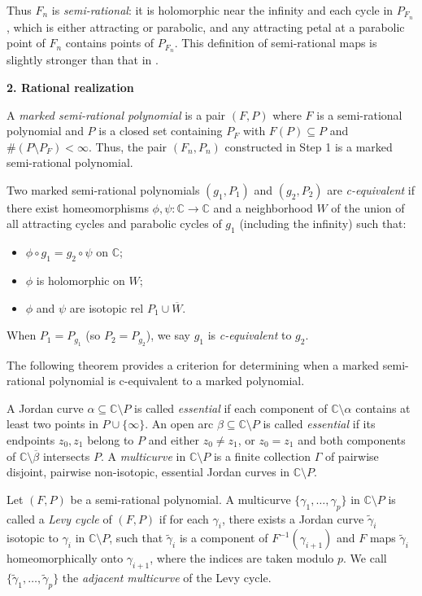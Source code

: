 \documentclass[a4paper,reqno,times, 11pt]{amsart}
\theoremstyle{remark}
\theoremstyle{plain}
\numberwithin{equation}{section}
\newcommand{\wt}{\widetilde}
\def\g{\gamma}
\def\G{\Gamma}
\def\C{\mbox{$\mathbb C$}}
\begin{document}
		Thus $F_n$ is  \emph{semi-rational}: it is holomorphic near the infinity and  each cycle in $P_{F_n}$, which is either attracting or parabolic, and any attracting petal at a parabolic point of $F_n$ contains points of $P_{F_n}$. This definition of  semi-rational maps is slightly stronger than that in \cite{CT2}.
		
		\vspace{5pt}
		
		{\bf 2. Rational realization}\vspace{5pt}
		
		A \emph{marked semi-rational polynomial} is a pair $(F,P)$ where $F$ is a semi-rational polynomial and $P$ is a closed set containing $P_F$ with $F(P) \subseteq P$ and $\#(P \setminus P_F) < \infty$. Thus, the pair $(F_n, P_n)$ constructed in Step 1 is a marked semi-rational polynomial.
		
		Two marked semi-rational polynomials $(g_1,P_1)$ and $(g_2,P_2)$ are \emph{c-equivalent} if there exist homeomorphisms $\phi, \psi: \mathbb{C} \to \mathbb{C}$ and a neighborhood $W$ of the union of all attracting cycles and parabolic cycles of $g_1$ (including the infinity) such that:
		\begin{itemize}
			\item $\phi \circ g_1 = g_2 \circ \psi$ on $\mathbb{C}$;
			\item $\phi$ is holomorphic on $W$;
			\item $\phi$ and $\psi$ are isotopic rel $P_1 \cup \overline{W}$.
		\end{itemize}
	When $P_1 = P_{g_1}$ (so $P_2 = P_{g_2}$), we say $g_1$ is \emph{c-equivalent} to $g_2$.

The following theorem provides a criterion for determining when a marked semi-rational polynomial is c-equivalent to a marked polynomial.
	
A Jordan curve  $\alpha\subseteq \C\setminus P$ is called \emph{essential} if each component of $\C\setminus \alpha$ contains at least two points in $P\cup\{\infty\}$. An open arc $\beta\subseteq\C\setminus P$ is called \emph{essential} if its endpoints $z_0,z_1$ belong to $P$ and either $z_0\not=z_1$, or $z_0=z_1$ and both components of $\C\setminus \overline{\beta}$ intersects $P$.
A \emph{multicurve} in $\C\setminus P$ is  a finite collection $\G$ of pairwise disjoint, pairwise non-isotopic, essential Jordan curves in $\C\setminus P$.
		
		Let $(F,P)$ be a semi-rational polynomial. A multicurve $\{\g_1,\ldots,\g_p\}$ in $\C\setminus P$ is called a
		\emph{Levy cycle} of $(F,P)$ if for each $\g_i$,
		there exists a Jordan curve $\wt{\g}_i$  isotopic to $\g_i$ in $\C\setminus P$, such that $\wt{\g}_i$ is a component of $F^{-1}(\g_{i+1})$ and  $F$ maps $ \wt{\g}_i$ homeomorphically onto $\g_{i+1}$, where the indices are taken modulo $p$. We call $\{\wt{\g}_1,\ldots,\wt{\g}_p\}$  the \emph{adjacent multicurve} of the Levy cycle.
		
\end{document}

